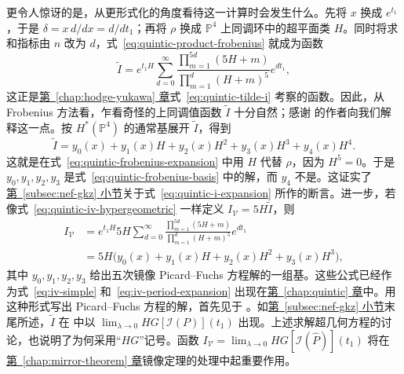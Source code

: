 \begin{example}[续]
更令人惊讶的是，从更形式化的角度看待这一计算时会发生什么。先将 $x$ 换成 $e^{t_1}$，于是 $\delta=x\,d/dx=d/dt_1$；再将 $\rho$ 换成
$\mathbb P^4$ 上同调环中的超平面类 $H$。同时将求和指标由 $n$ 改为 $d$，式~\eqref{eq:quintic-product-frobenius} 就成为函数
\[
\widetilde I=e^{t_1H}\sum_{d=0}^\infty
\frac{\prod_{m=1}^{5d}(5H+m)}{\prod_{m=1}^d(H+m)^5}e^{dt_1},
\]
这正是\hyperref[chap:hodge-yukawa]{第~\ref*{chap:hodge-yukawa} 章}式~\eqref{eq:quintic-tilde-i} 考察的函数。因此，从 Frobenius 方法看，乍看奇怪的上同调值函数 $\widetilde I$ 十分自然；感谢  的作者向我们解释这一点。按 $H^*(\mathbb P^4)$ 的通常基展开 $\widetilde I$，得到
\[
\widetilde I=y_0(x)+y_1(x)H+y_2(x)H^2+y_3(x)H^3+y_4(x)H^4.
\]
这就是在式~\eqref{eq:quintic-frobenius-expansion} 中用 $H$ 代替 $\rho$，因为 $H^5=0$。于是 $y_0,y_1,y_2,y_3$ 是式~\eqref{eq:quintic-frobenius-basis} 中的解，而 $y_4$ 不是。这证实了\hyperref[subsec:nef-gkz]{第~\ref*{subsec:nef-gkz} 小节}关于式~\eqref{eq:quintic-i-expansion} 所作的断言。进一步，若像式~\eqref{eq:quintic-iv-hypergeometric} 一样定义 $I_{\mathcal V}=5H\widetilde I$，则
\[
\begin{aligned}
I_{\mathcal V}
&=e^{t_1H}5H\sum_{d=0}^\infty
\frac{\prod_{m=1}^{5d}(5H+m)}{\prod_{m=1}^d(H+m)^5}e^{dt_1}\\
&=5H\bigl(y_0(x)+y_1(x)H+y_2(x)H^2+y_3(x)H^3\bigr),
\end{aligned}
\]
其中 $y_0,y_1,y_2,y_3$ 给出五次镜像 Picard--Fuchs 方程解的一组基。这些公式已经作为式~\eqref{eq:iv-simple} 和~\eqref{eq:iv-period-expansion} 出现在\hyperref[chap:quintic]{第~\ref*{chap:quintic} 章}中。用这种形式写出 Picard--Fuchs 方程的解，首先见于 。如\hyperref[subsec:nef-gkz]{第~\ref*{subsec:nef-gkz} 小节}末尾所述，$\widetilde I$ 在  中以 $\lim_{\lambda\to0}HG[\mathcal I(P)](t_1)$ 出现。上述求解超几何方程的讨论，也说明了为何采用“$HG$”记号。函数
$I_{\mathcal V}=\lim_{\lambda\to0}HG[\mathcal I(\widehat P)](t_1)$ 将在\hyperref[chap:mirror-theorem]{第~\ref*{chap:mirror-theorem} 章}镜像定理的处理中起重要作用。
\end{example}
\endgroup

